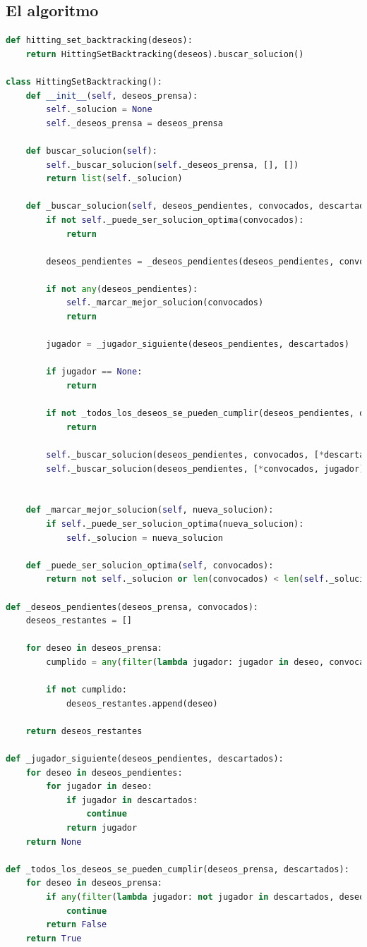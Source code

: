 \documentclass{estilo}
\begin{document}
\subsection{El algoritmo}
\begin{lstlisting}[language=Python]
def hitting_set_backtracking(deseos):
    return HittingSetBacktracking(deseos).buscar_solucion()

class HittingSetBacktracking():
    def __init__(self, deseos_prensa):
        self._solucion = None
        self._deseos_prensa = deseos_prensa
    
    def buscar_solucion(self):
        self._buscar_solucion(self._deseos_prensa, [], [])
        return list(self._solucion)

    def _buscar_solucion(self, deseos_pendientes, convocados, descartados):
        if not self._puede_ser_solucion_optima(convocados):
            return
            
        deseos_pendientes = _deseos_pendientes(deseos_pendientes, convocados)
        
        if not any(deseos_pendientes):
            self._marcar_mejor_solucion(convocados)
            return
    
        jugador = _jugador_siguiente(deseos_pendientes, descartados)
    
        if jugador == None:
            return
    
        if not _todos_los_deseos_se_pueden_cumplir(deseos_pendientes, descartados):
            return
                
        self._buscar_solucion(deseos_pendientes, convocados, [*descartados, jugador])
        self._buscar_solucion(deseos_pendientes, [*convocados, jugador], descartados)


    def _marcar_mejor_solucion(self, nueva_solucion):
        if self._puede_ser_solucion_optima(nueva_solucion):
            self._solucion = nueva_solucion
        
    def _puede_ser_solucion_optima(self, convocados):
        return not self._solucion or len(convocados) < len(self._solucion)

def _deseos_pendientes(deseos_prensa, convocados):
    deseos_restantes = []

    for deseo in deseos_prensa:
        cumplido = any(filter(lambda jugador: jugador in deseo, convocados))
        
        if not cumplido:
            deseos_restantes.append(deseo)
    
    return deseos_restantes

def _jugador_siguiente(deseos_pendientes, descartados):
    for deseo in deseos_pendientes:
        for jugador in deseo:
            if jugador in descartados:
                continue
            return jugador
    return None
    
def _todos_los_deseos_se_pueden_cumplir(deseos_prensa, descartados):
    for deseo in deseos_prensa:
        if any(filter(lambda jugador: not jugador in descartados, deseo)):
            continue
        return False
    return True

\end{lstlisting}
\end{document}
